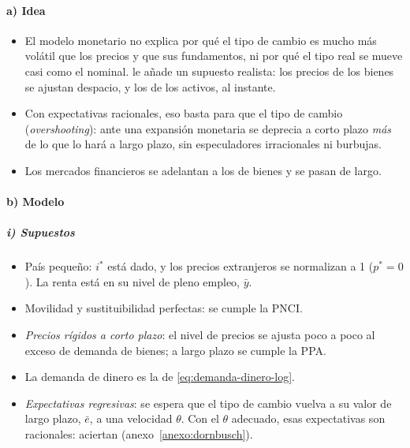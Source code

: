 \documentclass[11pt]{article}
\begin{document}
\paragraph{a) Idea}
\begin{itemize}
\item El modelo monetario no explica por qué el tipo de cambio es mucho más volátil que los precios y que sus fundamentos, ni por qué el tipo real se mueve casi como el nominal. \textcite{Dornbusch1976Expectations} le añade un supuesto realista: los precios de los bienes se ajustan despacio, y los de los activos, al instante.
\item Con expectativas racionales, eso basta para que el tipo de cambio  (\emph{overshooting}): ante una expansión monetaria se deprecia a corto plazo \emph{más} de lo que lo hará a largo plazo, sin especuladores irracionales ni burbujas.
\item Los mercados financieros se adelantan a los de bienes y se pasan de largo.
\end{itemize}

\paragraph{b) Modelo}
\subparagraph{i) Supuestos}
\begin{itemize}
\item País pequeño: $i^*$ está dado, y los precios extranjeros se normalizan a 1 ($p^*=0$). La renta está en su nivel de pleno empleo, $\bar y$.
\item Movilidad y sustituibilidad perfectas: se cumple la PNCI.
\item \emph{Precios rígidos a corto plazo}: el nivel de precios se ajusta poco a poco al exceso de demanda de bienes; a largo plazo se cumple la PPA.
\item La demanda de dinero es la de \eqref{eq:demanda-dinero-log}.
\item \emph{Expectativas regresivas}: se espera que el tipo de cambio vuelva a su valor de largo plazo, $\bar e$, a una velocidad $\theta$. Con el $\theta$ adecuado, esas expectativas son racionales: aciertan (anexo~\ref{anexo:dornbusch}).
\end{itemize}
\end{document}
